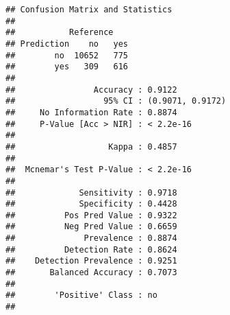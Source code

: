 \documentclass[
]{article}
\newenvironment{Shaded}{\begin{snugshade}}{\end{snugshade}}
\newcommand{\AttributeTok}[1]{\textcolor[rgb]{0.13,0.29,0.53}{#1}}
\newcommand{\CommentTok}[1]{\textcolor[rgb]{0.56,0.35,0.01}{\textit{#1}}}
\newcommand{\ConstantTok}[1]{\textcolor[rgb]{0.56,0.35,0.01}{#1}}
\newcommand{\DecValTok}[1]{\textcolor[rgb]{0.00,0.00,0.81}{#1}}
\newcommand{\FloatTok}[1]{\textcolor[rgb]{0.00,0.00,0.81}{#1}}
\newcommand{\FunctionTok}[1]{\textcolor[rgb]{0.13,0.29,0.53}{\textbf{#1}}}
\newcommand{\NormalTok}[1]{#1}
\newcommand{\OtherTok}[1]{\textcolor[rgb]{0.56,0.35,0.01}{#1}}
\newcommand{\SpecialCharTok}[1]{\textcolor[rgb]{0.81,0.36,0.00}{\textbf{#1}}}
\newcommand{\StringTok}[1]{\textcolor[rgb]{0.31,0.60,0.02}{#1}}
\begin{document}
\begin{verbatim}
## Confusion Matrix and Statistics
## 
##           Reference
## Prediction    no   yes
##        no  10652   775
##        yes   309   616
##                                           
##                Accuracy : 0.9122          
##                  95% CI : (0.9071, 0.9172)
##     No Information Rate : 0.8874          
##     P-Value [Acc > NIR] : < 2.2e-16       
##                                           
##                   Kappa : 0.4857          
##                                           
##  Mcnemar's Test P-Value : < 2.2e-16       
##                                           
##             Sensitivity : 0.9718          
##             Specificity : 0.4428          
##          Pos Pred Value : 0.9322          
##          Neg Pred Value : 0.6659          
##              Prevalence : 0.8874          
##          Detection Rate : 0.8624          
##    Detection Prevalence : 0.9251          
##       Balanced Accuracy : 0.7073          
##                                           
##        'Positive' Class : no              
## 
\end{verbatim}

\begin{Shaded}
\end{Shaded}
\end{document}
